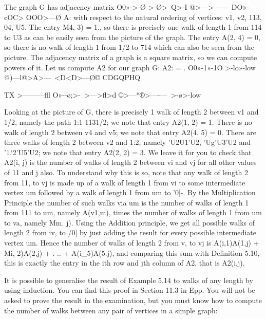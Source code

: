 
The graph G has adjacency matrix
O0»->-\O
>-\O>~Q>-I
@>—\®>—\>—\
DO»-¢OC>
OOO>—\O
A:
with respect to the natural ordering of vertices: v1, v2, 113, 04, U5.
The entry M4, 3) = 1., so there is precisely one walk of length 1 from
114 to U3 as can be easily seen from the picture of the graph. The
entry A(2, 4) = 0, so there is no walk of length 1 from 1/2 to 714 which
can also be seen from the picture.
The adjacency matrix of a graph is a square matrix, so we can
compute powers of it. Let us compute A2 for our graph G:
A2: = .
O0»-1»-1O
>-lo»-low
@)—l@>A>—\
<D<D>—\O©
CDGQPHQ
 \1
{TX
>—\>—\>—\>ﬂl\J
O»-\>-\o;>-\
>—\CDUJ>ﬂ>d
©>—*®>—-\>—\
>-\o>-low



Looking at the picture of G, there is precisely 1 walk of length 2
between v1 and 1/2, namely the path 1:1 1131/2; we note that entry
A2(1, 2) = 1.
There is no walk of length 2 between v4 and v5; we note that entry
A2(4. 5) = 0.
There are three walks of length 2 between v2 and 1:2, namely 'U2U1'U2,
'Ug'U3'U2 and '1.‘2’U5'U2; we note that entry A2(2, 2) = 3.
We leave it for you to check that A2(i, j) is the number of walks of
length 2 between vi and vj for all other values of 11 and j also.
To understand why this is so, note that any walk of length 2 from 11,
to vj is made up of a walk of length 1 from vi to some intermediate
vertex um followed by a walk of length 1 from um to '0]-. By the
Multiplication Principle the number of such walks via um is the
number of walks of length 1 from 111 to um, namely A(v1,m), times the
number of walks of length 1 from um to va, namely Mm. j). Using
the Addition principle, we get all possible walks of length 2 from iv,
to /0] by just adding the result for every possible intermediate vertex
um. Hence the number of walks of length 2 from v, to vj is
A(i,1)A(1,j) + Mi, 2)A(2,j) + . .. + A(i_5)A(5.j),
and comparing this sum with Deﬁnition 5.10, this is exactly the
entry in the ith row and jth column of A2, that is A2(i,j).

It is possible to generalise the result of Example 5.14 to walks of any
length by using induction. You can ﬁnd this proof in Section 11.3 in
Epp. You will not be asked to prove the result in the examination,
but you must know how to compute the number of walks between
any pair of vertices in a simple graph:

}
